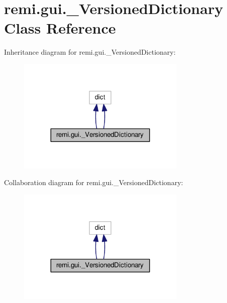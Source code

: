 \hypertarget{classremi_1_1gui_1_1__VersionedDictionary}{}\section{remi.\+gui.\+\_\+\+Versioned\+Dictionary Class Reference}
\label{classremi_1_1gui_1_1__VersionedDictionary}


Inheritance diagram for remi.\+gui.\+\_\+\+Versioned\+Dictionary\+:
\nopagebreak
\begin{figure}[H]
\begin{center}
\leavevmode
\includegraphics[width=227pt]{d0/df1/classremi_1_1gui_1_1__VersionedDictionary__inherit__graph}
\end{center}
\end{figure}


Collaboration diagram for remi.\+gui.\+\_\+\+Versioned\+Dictionary\+:
\nopagebreak
\begin{figure}[H]
\begin{center}
\leavevmode
\includegraphics[width=227pt]{d8/d9f/classremi_1_1gui_1_1__VersionedDictionary__coll__graph}
\end{center}
\end{figure}
